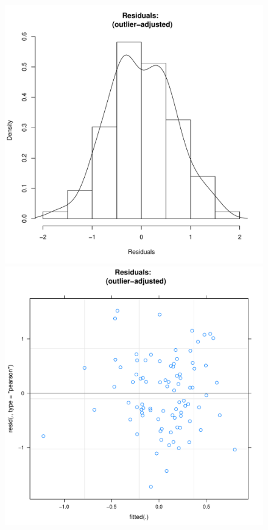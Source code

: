 \begin{CJK}{UTF8}{gbsn}
       \begin{figure}[!htbp]
         \includegraphics[scale =.4]{images/MLM21bOutHist.pdf}
         \includegraphics[scale =.4]{images/MLM21bOutScatter.pdf}

\end{figure}
\end{CJK}

